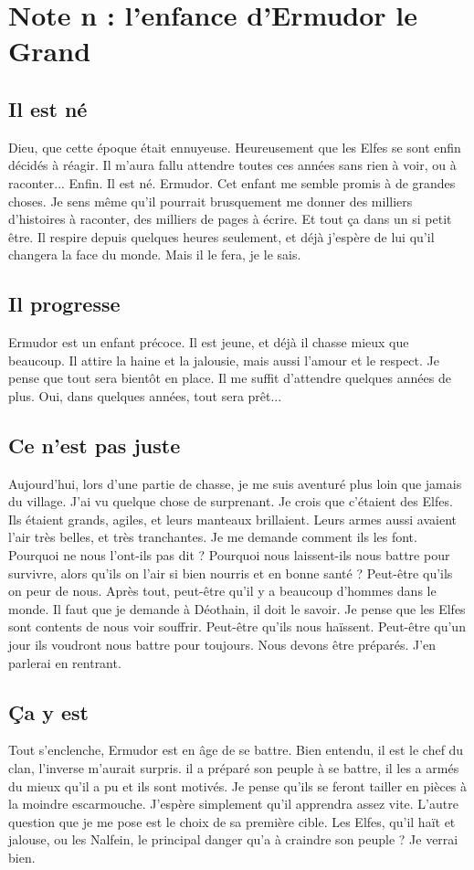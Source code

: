 \section{Note n : l'enfance d'Ermudor le Grand}
\subsection{Il est né}
Dieu, que cette époque était ennuyeuse. Heureusement que les Elfes se sont enfin décidés à réagir. Il m'aura fallu attendre toutes ces années sans rien à voir, ou à raconter... Enfin. Il est né. Ermudor. Cet enfant me semble promis à de grandes choses. Je sens même qu'il pourrait brusquement me donner des milliers d'histoires à raconter, des milliers de pages à écrire. Et tout ça dans un si petit être. Il respire depuis quelques heures seulement, et déjà j'espère de lui qu'il changera la face du monde. Mais il le fera, je le sais.

\subsection{Il progresse}
Ermudor est un enfant précoce. Il est jeune, et déjà il chasse mieux que beaucoup. Il attire la haine et la jalousie, mais aussi l'amour et le respect. Je pense que tout sera bientôt en place. Il me suffit d'attendre quelques années de plus. Oui, dans quelques années, tout sera prêt...

\subsection{Ce n'est pas juste}
Aujourd'hui, lors d'une partie de chasse, je me suis aventuré plus loin que jamais du village. J'ai vu quelque chose de surprenant. Je crois que c'étaient des Elfes. Ils étaient grands, agiles, et leurs manteaux brillaient. Leurs armes aussi avaient l'air très belles, et très tranchantes. Je me demande comment ils les font. Pourquoi ne nous l'ont-ils pas dit ? Pourquoi nous laissent-ils nous battre pour survivre, alors qu'ils on l'air si bien nourris et en bonne santé ? Peut-être qu'ils on peur de nous. Après tout, peut-être qu'il y a beaucoup d'hommes dans le monde. Il faut que je demande à Déothain, il doit le savoir. Je pense que les Elfes sont contents de nous voir souffrir. Peut-être qu'ils nous haïssent. Peut-être qu'un jour ils voudront nous battre pour toujours. Nous devons être préparés. J'en parlerai en rentrant.

\subsection{Ça y est}
Tout s'enclenche, Ermudor est en âge de se battre. Bien entendu, il est le chef du clan, l'inverse m'aurait surpris. il a préparé son peuple à se battre, il les a armés du mieux qu'il a pu et ils sont motivés. Je pense qu'ils se feront tailler en pièces à la moindre escarmouche. J'espère simplement qu'il apprendra assez vite. L'autre question que je me pose est le choix de sa première cible. Les Elfes, qu'il haït et jalouse, ou les Nalfein, le principal danger qu'a à craindre son peuple ? Je verrai bien.
